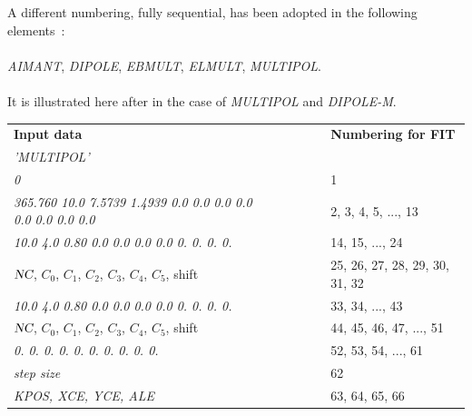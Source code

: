\bigskip

\noindent A different numbering,  fully sequential, has been adopted in the following elements~: \\
\\
 \textsl{AIMANT},   \textsl{DIPOLE}, 
 \textsl{EBMULT}, \textsl{ELMULT}, 
\textsl{MULTIPOL}.  \\
\\
It is  illustrated  here after 
in the case of \textsl{MULTIPOL} and \textsl{DIPOLE-M}. 

\begin{center}
{\renewcommand{\arraystretch}{1}
	\begin{tabular}{lcl}
	\textbf{Input  data}  &~~~~~~~~&  \textbf{Numbering  for  FIT}\\[1ex]
      \textsl{'MULTIPOL'}                      \\
	\textsl{0 }     &  &  1 \\
	\textsl{365.760 10.0 7.5739 1.4939 0.0 0.0 0.0 0.0 0.0 0.0 0.0 0.0} &&  2, 3, 4, 5, ..., 13    \\
	\textsl{10.0  4.0  0.80 0.0 0.0 0.0 0.0 0. 0. 0. 0. }     &&  14, 15, ..., 24       \\
	$\textsl{NC}$, $C_0$, $C_1$, $C_2$, $C_3$, $C_4$, $C_5$, shift &&  25, 26, 27, 28, 29, 30, 31, 32  \\
	\textsl{10.0  4.0  0.80 0.0 0.0 0.0 0.0 0. 0. 0. 0. }     &&  33, 34, ..., 43       \\
	$\textsl{NC}$, $C_0$, $C_1$, $C_2$, $C_3$, $C_4$, $C_5$, shift &&  44, 45, 46, 47, ...,    51    \\
	\textsl{0. 0. 0. 0. 0. 0. 0. 0. 0. 0.  }     &&  52, 53, 54, ..., 61   \\
	\textsl{ step size }     && 62    \\
	\textsl{ KPOS, XCE, YCE, ALE }     && 63, 64, 65, 66    \\
	\end{tabular}   }
\end{center}

\newpage

